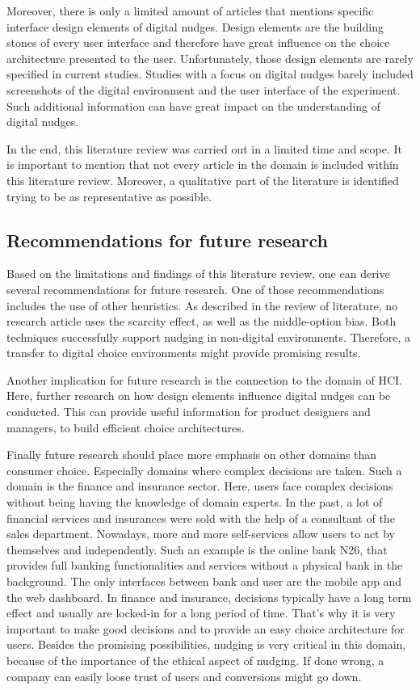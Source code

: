 Moreover, there is only a limited amount of articles that mentions specific interface design elements of digital nudges. Design elements are the building stones of every user interface and therefore have great influence on the choice architecture presented to the user. Unfortunately, those design elements are rarely specified in current studies. Studies with a focus on digital nudges barely included screenshots of the digital environment and the user interface of the experiment. Such additional information can have great impact on the understanding of digital nudges.

In the end, this literature review was carried out in a limited time and scope. It is important to mention that not every article in the domain is included within this literature review. Moreover, a qualitative part of the literature is identified trying to be as representative as possible.
 
 \subsection{Recommendations for future research}
 
 Based on the limitations and findings of this literature review, one can derive several recommendations for future research.
 One of those recommendations includes the use of other heuristics. As described in the review of literature, no research article uses the scarcity effect, as well as the middle-option bias. Both techniques successfully support nudging in non-digital environments. Therefore, a transfer to digital choice environments might provide promising results.
 
 Another implication for future research is the connection to the domain of HCI. Here, further research on how design elements influence digital nudges can be conducted. This can provide useful information for product designers and managers, to build efficient choice architectures. 
 
 Finally future research should place more emphasis on other domains than consumer choice. Especially domains where complex decisions are taken. Such a domain is the finance and insurance sector. Here, users face complex decisions without being having the knowledge of domain experts. In the past, a lot of financial services and insurances were sold with the help of a consultant of the sales department. Nowadays, more and more self-services allow users to act by themselves and independently. Such an example is the online bank N26, that provides full banking functionalities and services without a physical bank in the background. The only interfaces between bank and user are the mobile app and the web dashboard. In finance and insurance, decisions typically have a long term effect and usually are locked-in for a long period of time. That's why it is very important to make good decisions and to provide an easy choice architecture for users. Besides the promising possibilities, nudging is very critical in this domain, because of the importance of the ethical aspect of nudging. If done wrong, a company can easily loose trust of users and conversions might go down. 